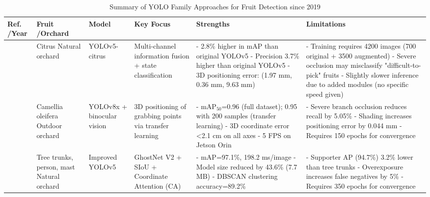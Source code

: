 \documentclass[pdflatex,sn-mathphys-num]{sn-jnl}
\begin{document}
\begin{table}[htbp]
	\centering
	\small
	\caption{Summary of YOLO Family Approaches for Fruit Detection since 2019} 
	\renewcommand{\arraystretch}{1.3}
	\begin{tabular}{p{1cm}p{1.2cm}p{1cm}p{2cm}p{2.5cm}p{2.8cm}}
	\toprule
	\textbf{Ref. \newline /Year} & \textbf{Fruit \newline /Orchard} & \textbf{Model} & \textbf{Key Focus} & \textbf{Strengths} & \textbf{Limitations} \\ \midrule
	 \cite{yu2024object} \newline 2024 & Citrus \newline Natural orchard & YOLOv5-citrus & Multi-channel information fusion + state classification & - 2.8\% higher in mAP than original YOLOv5 \newline - Precision 3.7\% higher than original YOLOv5 \newline - 3D positioning error: (1.97 mm, 0.36 mm, 9.63 mm) & - Training requires 4200 images (700 original + 3500 augmented) \newline - Severe occlusion may misclassify "difficult-to-pick" fruits \newline - Slightly slower inference due to added modules (no specific speed given) \\ \midrule
	\cite{ZHOU2024110} \newline 2024 & Camellia oleifera \newline Outdoor orchard & YOLOv8x + binocular vision & 3D positioning of grabbing points via transfer learning & - mAP$_{50}$=0.96 (full dataset); 0.95 with 200 samples (transfer learning) \newline - 3D coordinate error <2.1 cm on all axes \newline - 5 FPS on Jetson Orin & - Severe branch occlusion reduces recall by 5.05\% \newline - Shading increases positioning error by 0.044 mm \newline - Requires 150 epochs for convergence \\ \midrule
	\cite{ZHANG2024108780} \newline 2024 & Tree trunks, person, mast \newline Natural orchard & Improved YOLOv5 & GhostNet V2 + SIoU + Coordinate Attention (CA) & - mAP=97.1\%, 198.2 ms/image \newline - Model size reduced by 43.6\% (7.7 MB) \newline - DBSCAN clustering accuracy=89.2\% & - Supporter AP (94.7\%) 3.2\% lower than tree trunks \newline - Overexposure increases false negatives by 5\% \newline - Requires 350 epochs for convergence \\ \midrule

\end{tabular}
\end{table}
\end{document}
